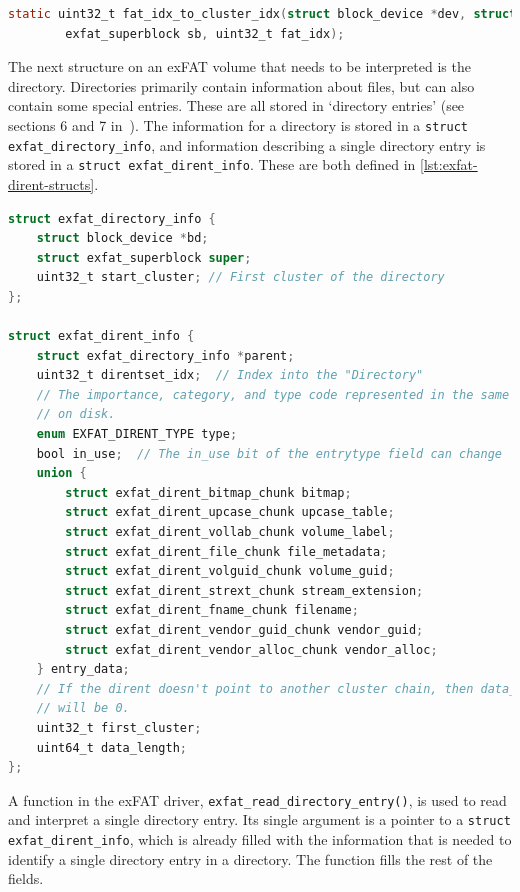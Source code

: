 \documentclass{article}
\begin{document}
\begin{lstlisting}[language=C, caption={The function which is used to get the
                   cluster index of the next cluster in a cluster chain},
                   float, label={lst:exfat-read-fat}]
static uint32_t fat_idx_to_cluster_idx(struct block_device *dev, struct
        exfat_superblock sb, uint32_t fat_idx);
\end{lstlisting}

The next structure on an exFAT volume that needs to be interpreted is the
directory. Directories primarily contain information about files, but can also
contain some special entries. These are all stored in `directory entries' (see
sections 6 and 7 in~\cite{exFAT-specs}). The information for a directory is
stored in a \verb!struct exfat_directory_info!, and information describing a
single directory entry is stored in a \verb!struct exfat_dirent_info!. These
are both defined in \autoref{lst:exfat-dirent-structs}.

\begin{lstlisting}[language=C, caption={The structures which describe
                   directories and directory entries on an exFAT volume},
                   float, label={lst:exfat-dirent-structs}]
struct exfat_directory_info {
    struct block_device *bd;
    struct exfat_superblock super;
    uint32_t start_cluster; // First cluster of the directory
};

struct exfat_dirent_info {
    struct exfat_directory_info *parent;
    uint32_t direntset_idx;  // Index into the "Directory"
    // The importance, category, and type code represented in the same way as
    // on disk.
    enum EXFAT_DIRENT_TYPE type;
    bool in_use;  // The in_use bit of the entrytype field can change
    union {
        struct exfat_dirent_bitmap_chunk bitmap;
        struct exfat_dirent_upcase_chunk upcase_table;
        struct exfat_dirent_vollab_chunk volume_label;
        struct exfat_dirent_file_chunk file_metadata;
        struct exfat_dirent_volguid_chunk volume_guid;
        struct exfat_dirent_strext_chunk stream_extension;
        struct exfat_dirent_fname_chunk filename;
        struct exfat_dirent_vendor_guid_chunk vendor_guid;
        struct exfat_dirent_vendor_alloc_chunk vendor_alloc;
    } entry_data;
    // If the dirent doesn't point to another cluster chain, then data_length
    // will be 0.
    uint32_t first_cluster;
    uint64_t data_length;
};
\end{lstlisting}

A function in the exFAT driver, \verb!exfat_read_directory_entry()!, is used to
read and interpret a single directory entry. Its single argument is a pointer
to a \verb!struct exfat_dirent_info!, which is already filled with the
information that is needed to identify a single directory entry in a directory.
The function fills the rest of the fields.
\end{document}
